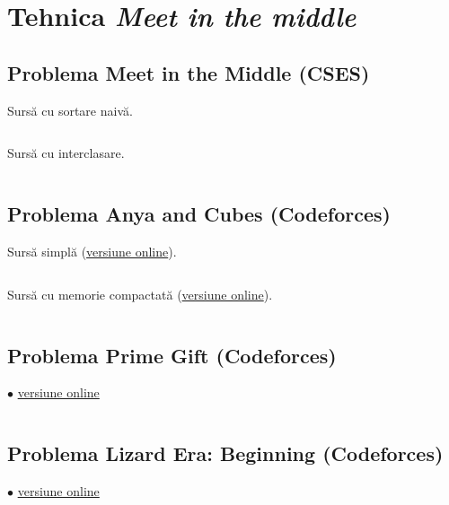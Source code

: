 \documentclass[../main.tex]{subfiles}
\begin{document}
\chapter{Tehnica \textit{Meet in the middle}}

\section{Problema Meet in the Middle (CSES)}
\label{code:meet-in-the-middle}

Sursă cu sortare naivă.

\inputminted{cpp}{../src/bit-mastery/meet-in-the-middle-1.cpp}

Sursă cu interclasare.

\inputminted{cpp}{../src/bit-mastery/meet-in-the-middle-2.cpp}

\section{Problema Anya and Cubes (Codeforces)}
\label{code:anya-and-cubes}

Sursă simplă (\href{https://codeforces.com/contest/525/submission/288515213}{versiune online}).

\inputminted{cpp}{../src/bit-mastery/anya-and-cubes-1.cpp}

Sursă cu memorie compactată (\href{https://codeforces.com/contest/525/submission/288523979}{versiune online}).

\inputminted{cpp}{../src/bit-mastery/anya-and-cubes-2.cpp}

\section{Problema Prime Gift (Codeforces)}
\label{code:prime-gift}
$\bullet$
\href{https://codeforces.com/contest/912/submission/288250102}{versiune online}

\inputminted{cpp}{../src/bit-mastery/prime-gift.cpp}

\section{Problema Lizard Era: Beginning (Codeforces)}
\label{code:lizard-era-beginning}
$\bullet$
\href{https://codeforces.com/contest/585/submission/246272902}{versiune online}

\inputminted{cpp}{../src/bit-mastery/lizard-era-beginning.cpp}
\end{document}

